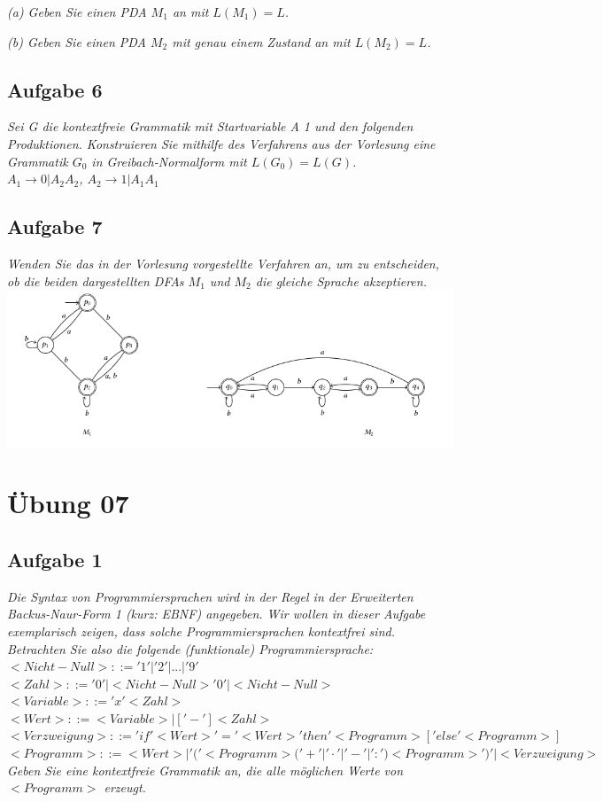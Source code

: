 \documentclass[a4paper]{article}
\begin{document}
\textit{(a) Geben Sie einen PDA $M_1$ an mit $L(M_1) = L$.}

\textit{(b) Geben Sie einen PDA $M_2$ mit genau einem Zustand an mit $L(M_2) = L$.}


\subsection{Aufgabe 6}
\textit{Sei G die kontextfreie Grammatik mit Startvariable A 1 und den folgenden Produktionen. Konstruieren Sie mithilfe des Verfahrens aus der Vorlesung eine Grammatik $G_0$ in Greibach-Normalform mit $L(G_0) = L(G)$.\\
    $A_1\rightarrow 0 | A_2 A_2$, $A_2 \rightarrow 1 | A_1 A_1$}


\subsection{Aufgabe 7}
\textit{Wenden Sie das in der Vorlesung vorgestellte Verfahren an, um zu entscheiden, ob die beiden dargestellten DFAs $M_1$ und $M_2$ die gleiche Sprache akzeptieren.}
\includegraphics{Assets/ASK_uebung/u06_03.png}


\newpage
\section{Übung 07}
\subsection{Aufgabe 1}
\textit{Die Syntax von Programmiersprachen wird in der Regel in der Erweiterten Backus-Naur-Form 1 (kurz: EBNF) angegeben. Wir wollen in dieser Aufgabe exemplarisch zeigen, dass solche Programmiersprachen kontextfrei sind. Betrachten Sie also die folgende (funktionale) Programmiersprache:
$<Nicht-Null> ::= '1' | '2' | . . . |'9'$\\
$<Zahl> ::= '0' | <Nicht-Null> { '0' | <Nicht-Null> }$\\
$<Variable> ::= 'x' <Zahl>$\\
$<Wert> ::= <Variable> | [ '-' ] <Zahl>$\\
$<Verzweigung> ::= 'if' <Wert> '=' <Wert> 'then' <Programm> [ 'else' <Programm> ]$\\
$<Programm> ::= <Wert> | '(' <Programm> ( '+' | '·' | '-' | ':' ) <Programm> ')' | <Verzweigung>$\\
Geben Sie eine kontextfreie Grammatik an, die alle möglichen Werte von $<Programm>$ erzeugt.}
\end{document}
